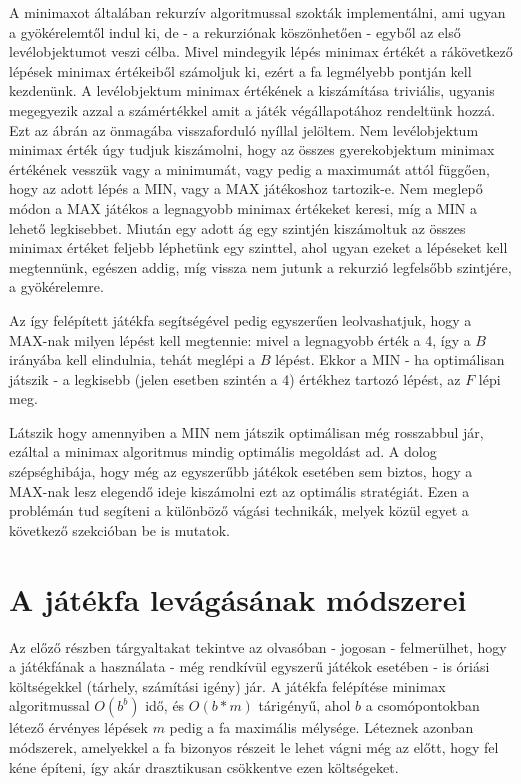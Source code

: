 A minimaxot általában rekurzív algoritmussal szokták implementálni, ami ugyan a gyökérelemtől indul ki, de - a rekurziónak köszönhetően - egyből az első levélobjektumot veszi célba. Mivel mindegyik lépés minimax értékét a rákövetkező lépések minimax értékeiből számoljuk ki, ezért a fa legmélyebb pontján kell kezdenünk. A levélobjektum minimax értékének a kiszámítása triviális, ugyanis megegyezik azzal a számértékkel amit a játék végállapotához rendeltünk hozzá. Ezt az ábrán az önmagába visszaforduló nyíllal jelöltem. Nem levélobjektum minimax érték úgy tudjuk kiszámolni, hogy az összes gyerekobjektum minimax értékének vesszük vagy a minimumát, vagy pedig a maximumát attól függően, hogy az adott lépés a MIN, vagy a MAX játékoshoz tartozik-e. Nem meglepő módon a MAX játékos a legnagyobb minimax értékeket keresi, míg a MIN a lehető legkisebbet. Miután egy adott ág egy szintjén kiszámoltuk az összes minimax értéket feljebb léphetünk egy szinttel, ahol ugyan ezeket a lépéseket kell megtennünk, egészen addig, míg vissza nem jutunk a rekurzió legfelsőbb szintjére, a gyökérelemre.\ujsor

Az így felépített játékfa segítségével pedig egyszerűen leolvashatjuk, hogy a MAX-nak milyen lépést kell megtennie: mivel a legnagyobb érték a 4, így a $B$ irányába kell elindulnia, tehát meglépi a $B$ lépést. Ekkor a MIN - ha optimálisan játszik - a legkisebb (jelen esetben szintén a 4) értékhez tartozó lépést, az $F$ lépi meg.\ujsor

Látszik hogy amennyiben a MIN nem játszik optimálisan még rosszabbul jár, ezáltal a minimax algoritmus mindig optimális megoldást ad. A dolog szépséghibája, hogy még az egyszerűbb játékok esetében sem biztos, hogy a MAX-nak lesz elegendő ideje kiszámolni ezt az optimális stratégiát. Ezen a problémán tud segíteni a különböző vágási technikák, melyek közül egyet a következő szekcióban be is mutatok.


\section{A játékfa levágásának módszerei}
Az előző részben tárgyaltakat tekintve az olvasóban - jogosan - felmerülhet, hogy a játékfának a használata - még rendkívül egyszerű játékok esetében - is óriási költségekkel (tárhely, számítási igény) jár. A játékfa felépítése minimax algoritmussal $O(b^b)$ idő, és $O(b*m)$ tárigényű, ahol $b$ a csomópontokban létező érvényes lépések $m$ pedig a fa maximális mélysége. Léteznek azonban módszerek, amelyekkel a fa bizonyos részeit le lehet vágni még az előtt, hogy fel kéne építeni, így akár drasztikusan csökkentve ezen költségeket.


